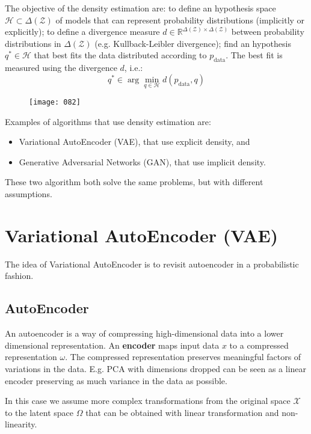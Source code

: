 The objective of the density estimation are: to define an hypothesis space \(\mathcal{H} \subset \Delta(\mathcal{Z})\) of models that can represent probability distributions (implicitly or explicitly); to define a divergence measure \(d \in \mathbb{R}^{\Delta(\mathcal{Z}) \times \Delta(\mathcal{Z})}\) between probability distributions in \(\Delta(\mathcal{Z})\) (e.g. Kullback-Leibler divergence); find an hypothesis \(q^* \in \mathcal{H}\) that best fits the data distributed according to \(p_\text{data}\). The best fit is measured using the divergence \(d\), i.e.:
\begin{equation}
    q^* \in \arg \min_{q \in \mathcal{H}} d(p_\text{data}, q)
\end{equation}
\begin{figure}[h!]
    \centering
    \texttt{[image: 082]}
    \caption{}
    \label{fig:082}
\end{figure}

Examples of algorithms that use density estimation are:
\begin{itemize}
    \item Variational AutoEncoder (VAE), that use explicit density, and
    \item Generative Adversarial Networks (GAN), that use implicit density.
\end{itemize}
These two algorithm both solve the same problems, but with different assumptions.

\section{Variational AutoEncoder (VAE)}
The idea of Variational AutoEncoder is to revisit autoencoder in a probabilistic fashion.

\subsection{AutoEncoder}
An autoencoder is a way of compressing high-dimensional data into a lower dimensional representation. An \textbf{encoder} maps input data \(x\) to a compressed representation \(\omega\). The compressed representation preserves meaningful factors of variations in the data. E.g. PCA with dimensions dropped can be seen as a linear encoder preserving as much variance in the data as possible. 

In this case we assume more complex transformations from the original space \(\mathcal{X}\) to the latent space \(\Omega\) that can be obtained with linear transformation and non-linearity.

